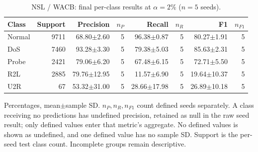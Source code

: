 \begin{table}[t]
\centering\scriptsize
\setlength{\tabcolsep}{3.3pt}
\caption{NSL / WACB: final per-class results at $\alpha=2\%$ ($n=5$ seeds).}\label{tab:forgetting-class-nsl_kdd-wacb}
\begin{tabular}{lrrrrrrr}
\toprule
Class & Support & Precision & $n_P$ & Recall & $n_R$ & F1 & $n_{F1}$ \\
\midrule
Normal & 9711 & 68.80$\pm$2.60 & 5 & 96.38$\pm$0.87 & 5 & 80.27$\pm$1.91 & 5 \\
DoS & 7460 & 93.28$\pm$3.30 & 5 & 79.38$\pm$5.03 & 5 & 85.63$\pm$2.31 & 5 \\
Probe & 2421 & 79.06$\pm$6.20 & 5 & 67.48$\pm$6.15 & 5 & 72.71$\pm$5.50 & 5 \\
R2L & 2885 & 79.76$\pm$12.95 & 5 & 11.57$\pm$6.90 & 5 & 19.64$\pm$10.37 & 5 \\
U2R & 67 & 53.32$\pm$31.00 & 5 & 28.66$\pm$17.98 & 5 & 26.89$\pm$10.18 & 5 \\
\bottomrule
\end{tabular}
\par\smallskip\begin{minipage}{0.98\textwidth}\scriptsize Percentages, mean$\pm$sample SD. $n_P,n_R,n_{F1}$ count defined seeds separately. A class receiving no predictions has undefined precision, retained as null in the raw seed result; only defined values enter that metric's aggregate. No defined values is shown as undefined, and one defined value has no sample SD. Support is the per-seed test class count. Incomplete groups remain descriptive.\end{minipage}
\end{table}

